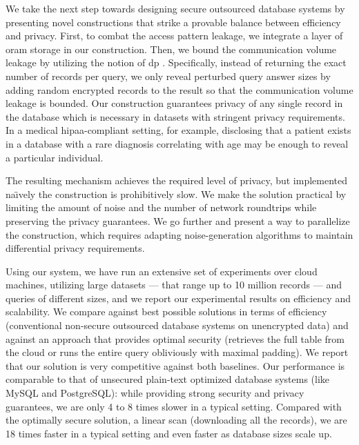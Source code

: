 	We take the next step towards designing secure outsourced database systems by presenting novel constructions that strike a provable balance between efficiency and privacy.
	First, to combat the access pattern leakage, we integrate a layer of \acrshort{oram} storage in our construction.
	Then, we bound the communication volume leakage by utilizing the notion of \acrfull{dp} \cite{differential-privacy-original}.
	Specifically, instead of returning the exact number of records per query, we only reveal perturbed query answer sizes by adding random encrypted records to the result so that the communication volume leakage is bounded.
	Our construction guarantees privacy of any single record in the database which is necessary in datasets with stringent privacy requirements.
	In a medical \acrshort{hipaa}-compliant setting, for example, disclosing that a patient exists in a database with a rare diagnosis correlating with age may be enough to reveal a particular individual.

	The resulting mechanism achieves the required level of privacy, but implemented na\"{\i}vely the construction is prohibitively slow.
	We make the solution practical by limiting the amount of noise and the number of network roundtrips while preserving the privacy guarantees.
	We go further and present a way to parallelize the construction, which requires adapting noise-generation algorithms to maintain differential privacy requirements.

	Using our system, we have run an extensive set of experiments over cloud machines, utilizing large datasets --- that range up to 10 million records --- and queries of different sizes, and we report our experimental results on efficiency and scalability.
	We compare against best possible solutions in terms of efficiency (conventional non-secure outsourced database systems on unencrypted data) and against an approach that provides optimal security (retrieves the full table from the cloud or runs the entire query obliviously with maximal padding).
	We report that our solution is very competitive against both baselines.
	Our performance is comparable to that of unsecured plain-text optimized database systems (like MySQL and PostgreSQL): while providing strong security and privacy guarantees, we are only 4 to 8 times slower in a typical setting.
	Compared with the optimally secure solution, a linear scan (downloading all the records), we are 18 times faster in a typical setting and even faster as database sizes scale up.

	\smallskip

